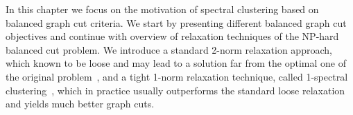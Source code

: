 In this chapter we focus on the motivation of spectral clustering based on balanced graph cut criteria. We start by presenting different balanced graph cut objectives and continue with overview of 
relaxation techniques of the NP-hard balanced cut problem. We introduce a standard 2-norm relaxation approach, which known to be loose and may lead to a solution far from the optimal one of the original problem~\cite{guattery1998},
and a tight 1-norm relaxation technique, called 1-spectral clustering~\cite{Buhler09,Hein10,HeinS11}, which in practice usually outperforms the standard loose relaxation and yields much better graph cuts.
%
% 
% 
% 
% 
% 
% 
% 
